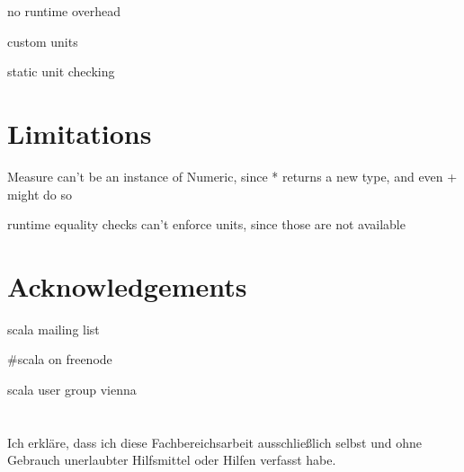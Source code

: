 \documentclass[12pt,oneside,a4paper]{scrbook}
\theoremstyle{definition}
\begin{document}
no runtime overhead

custom units

static unit checking

\chapter{Limitations}

Measure can't be an instance of Numeric, since * returns a new type, and even + might do so

runtime equality checks can't enforce units, since those are not available

\chapter{Acknowledgements}
scala mailing list

#scala on freenode

scala user group vienna


\singlespacing

{}

\chapter*{}
\onehalfspacing
Ich erkläre, dass ich diese Fachbereichsarbeit ausschließlich selbst und ohne Gebrauch unerlaubter Hilfsmittel oder Hilfen verfasst habe.
\end{document}
